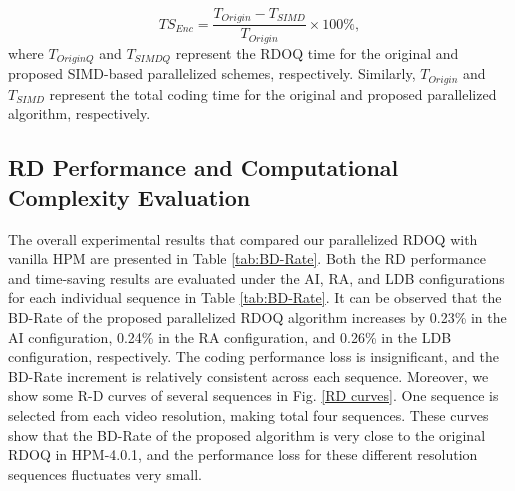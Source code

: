 \documentclass[lettersize,journal]{IEEEtran}
\begin{document}
\begin{equation}
	\label{TSEnc}
	TS_{Enc} = \frac{T_{Origin}-T_{SIMD}}{T_{Origin}} \times 100\%,
\end{equation}
where $T_{OriginQ}$ and $T_{SIMDQ}$ represent the RDOQ time for the original and proposed SIMD-based parallelized schemes, respectively. Similarly, $T_{Origin}$ and $T_{SIMD}$ represent the total coding time for the original and proposed parallelized algorithm, respectively. 

\subsection{RD Performance and Computational Complexity Evaluation}
The overall experimental results that compared our parallelized RDOQ with vanilla HPM are presented in Table \ref{tab:BD-Rate}. Both the RD performance and time-saving results are evaluated under the AI, RA, and LDB configurations for each individual sequence in Table \ref{tab:BD-Rate}. It can be observed that the BD-Rate of the proposed parallelized RDOQ algorithm increases by 0.23\% in the AI configuration, 0.24\% in the RA configuration, and 0.26\% in the LDB configuration, respectively. The coding performance loss is insignificant, and the BD-Rate increment is relatively consistent across each sequence. Moreover, we show some R-D curves of several sequences in Fig. \ref{RD curves}. One sequence is selected from each video resolution, making total four sequences. These curves show that the BD-Rate of the proposed algorithm is very close to the original RDOQ in HPM-4.0.1, and the performance loss for these different resolution sequences fluctuates very small. 
\end{document}
